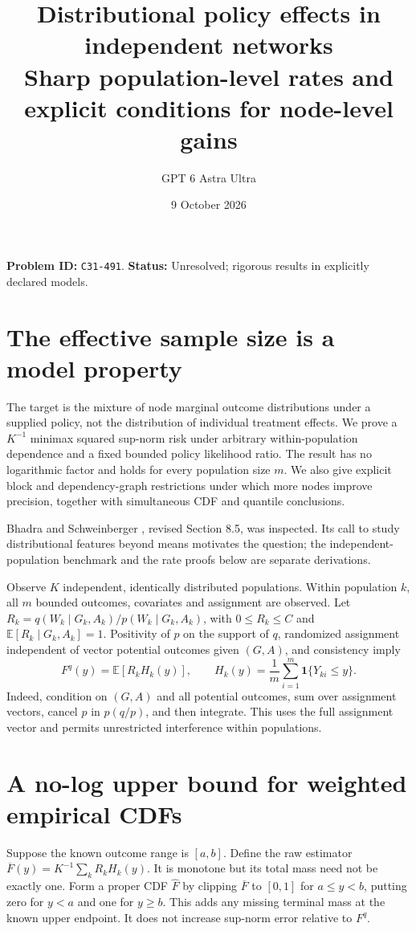 \documentclass[11pt]{article}
\author{GPT 6 Astra Ultra}
\date{9 October 2026}
\title{Distributional policy effects in independent networks\\\large Sharp population-level rates and explicit conditions for node-level gains}
\theoremstyle{remark}\newtheorem{remark}[theorem]{Remark}
\newcommand{\E}{\mathbb E}
\newcommand{\Ind}{\mathbf 1}
\begin{document}
\maketitle
\noindent\textbf{Problem ID:} \texttt{C31-491}. \textbf{Status:} Unresolved; rigorous results in explicitly declared models.
\section{The effective sample size is a model property}
The target is the mixture of node marginal outcome distributions under a supplied policy, not the distribution of individual treatment effects. We prove a $K^{-1}$ minimax squared sup-norm risk under arbitrary within-population dependence and a fixed bounded policy likelihood ratio. The result has no logarithmic factor and holds for every population size $m$. We also give explicit block and dependency-graph restrictions under which more nodes improve precision, together with simultaneous CDF and quantile conclusions.

Bhadra and Schweinberger \cite{bs}, revised Section 8.5, was inspected. Its call to study distributional features beyond means motivates the question; the independent-population benchmark and the rate proofs below are separate derivations.

Observe $K$ independent, identically distributed populations. Within population $k$, all $m$ bounded outcomes, covariates and assignment are observed. Let $R_k=q(W_k\mid G_k,A_k)/p(W_k\mid G_k,A_k)$, with $0\leq R_k\leq C$ and $\E[R_k\mid G_k,A_k]=1$. Positivity of $p$ on the support of $q$, randomized assignment independent of vector potential outcomes given $(G,A)$, and consistency imply
\[
 F^q(y)=\E[R_kH_k(y)],\qquad
 H_k(y)=\frac1m\sum_{i=1}^m\Ind\{Y_{ki}\leq y\}.
 \tag{2}
\]
Indeed, condition on $(G,A)$ and all potential outcomes, sum over assignment vectors, cancel $p$ in $p(q/p)$, and then integrate. This uses the full assignment vector and permits unrestricted interference within populations.

\section{A no-log upper bound for weighted empirical CDFs}
Suppose the known outcome range is $[a,b]$. Define the raw estimator
$\overline F(y)=K^{-1}\sum_kR_kH_k(y)$.
It is monotone but its total mass need not be exactly one. Form a proper CDF $\widehat F$ by clipping $\overline F$ to $[0,1]$ for $a\leq y<b$, putting zero for $y<a$ and one for $y\geq b$. This adds any missing terminal mass at the known upper endpoint. It does not increase sup-norm error relative to $F^q$.
\end{document}
